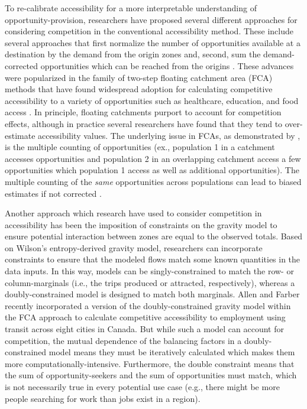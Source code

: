 \documentclass[]{elsarticle} %
\begin{document}
To re-calibrate accessibility for a more interpretable understanding of
opportunity-provision, researchers have proposed several different
approaches for considering competition in the conventional accessibility
method. These include several approaches that first normalize the number
of opportunities available at a destination by the demand from the
origin zones and, second, sum the demand-corrected opportunities which
can be reached from the origins \citep[e.g.][]{joseph1984, shen1998}.
These advances were popularized in the family of two-step floating
catchment area (FCA) methods \citep{luo2003} that have found widespread
adoption for calculating competitive accessibility to a variety of
opportunities such as healthcare, education, and food access
\citep{yang_comparing_2006, chen_spatial_2020, ye_spatial_2018, chen_enhancing_2019, chen_evaluating_2020}.
In principle, floating catchments purport to account for competition
effects, although in practice several researchers
\citep[e.g.,][]{delamater2013spatial, wan2012three} have found that they
tend to over-estimate accessibility values. The underlying issue in
FCAs, as demonstrated by \citet{paez2019}, is the multiple counting of
opportunities (ex., population 1 in a catchment accesses opportunities
and population 2 in an overlapping catchment access a few opportunities
which population 1 access as well as additional opportunities). The
multiple counting of the \emph{same} opportunities across populations
can lead to biased estimates if not corrected \citep{paez2019}.

Another approach which research have used to consider competition in
accessibility has been the imposition of constraints on the gravity
model to ensure potential interaction between zones are equal to the
observed totals. Based on Wilson's \citeyearpar{wilson1971}
entropy-derived gravity model, researchers can incorporate constraints
to ensure that the modeled flows match some known quantities in the data
inputs. In this way, models can be singly-constrained to match the row-
or column-marginals (i.e., the trips produced or attracted,
respectively), whereas a doubly-constrained model is designed to match
both marginals. Allen and Farber \citeyearpar{allen2019} recently
incorporated a version of the doubly-constrained gravity model within
the FCA approach to calculate competitive accessibility to employment
using transit across eight cities in Canada. But while such a model can
account for competition, the mutual dependence of the balancing factors
in a doubly-constrained model means they must be iteratively calculated
which makes them more computationally-intensive. Furthermore, the double
constraint means that the sum of opportunity-seekers and the sum of
opportunities must match, which is not necessarily true in every
potential use case (e.g., there might be more people searching for work
than jobs exist in a region).
\end{document}
